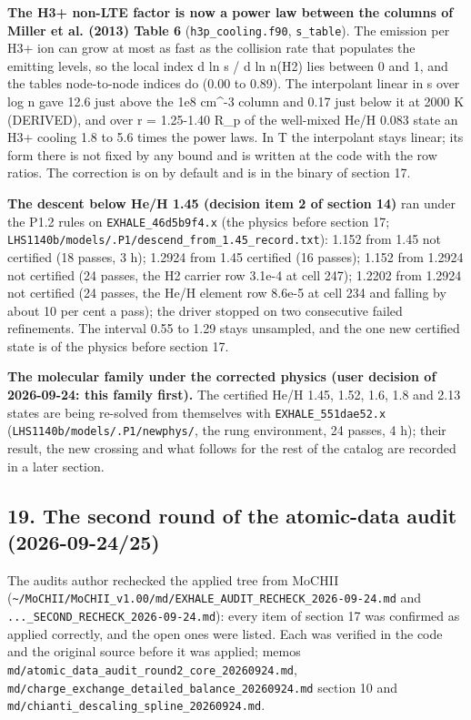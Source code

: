 \documentclass[english,a4paper]{my_memo}
\begin{document}
\textbf{The H3+ non-LTE factor is now a power law between the columns of Miller et
al. (2013) Table 6} (\texttt{h3p\_cooling.f90}, \texttt{s\_table}). The emission per H3+
ion can grow at most as fast as the collision rate that populates the
emitting levels, so the local index d ln s / d ln n(H2) lies between 0 and 1,
and the table\textquotesingle s node-to-node indices do (0.00 to 0.89). The interpolant
linear in s over log n gave 12.6 just above the 1e8 cm\^{}-3 column and 0.17
just below it at 2000 K (DERIVED), and over r = 1.25-1.40 R\_p of the
well-mixed He/H 0.083 state an H3+ cooling 1.8 to 5.6 times the power law\textquotesingle s.
In T the interpolant stays linear; its form there is not fixed by any bound
and is written at the code with the row ratios. The correction is on by
default and is in the binary of section 17.

\textbf{The descent below He/H 1.45 (decision item 2 of section 14)} ran under the
P1.2 rules on \texttt{EXHALE\_46d5b9f4.x} (the physics before section 17;
\texttt{LHS1140b/models/.P1/descend\_from\_1.45\_record.txt}): 1.152 from 1.45 not
certified (18 passes, 3 h); 1.2924 from 1.45 certified (16 passes); 1.152 from
1.2924 not certified (24 passes, the H2 carrier row 3.1e-4 at cell 247);
1.2202 from 1.2924 not certified (24 passes, the He/H element row 8.6e-5 at
cell 234 and falling by about 10 per cent a pass); the driver stopped on two
consecutive failed refinements. The interval 0.55 to 1.29 stays unsampled,
and the one new certified state is of the physics before section 17.

\textbf{The molecular family under the corrected physics (user decision of
2026-09-24: this family first).} The certified He/H 1.45, 1.52, 1.6, 1.8
and 2.13 states are being re-solved from themselves with
\texttt{EXHALE\_551dae52.x} (\texttt{LHS1140b/models/.P1/newphys/}, the rung environment,
24 passes, 4 h); their result, the new crossing and what follows for the
rest of the catalog are recorded in a later section.

\subsection{19. The second round of the atomic-data audit (2026-09-24/25)}\label{19-the-second-round-of-the-atomic-data-audit-2026-09-2425}

The audit\textquotesingle s author rechecked the applied tree from MoCHII
(\texttt{\textasciitilde{}/MoCHII/MoCHII\_v1.00/md/EXHALE\_AUDIT\_RECHECK\_2026-09-24.md} and
\texttt{...\_SECOND\_RECHECK\_2026-09-24.md}): every item of section 17 was confirmed as
applied correctly, and the open ones were listed. Each was verified in the
code and the original source before it was applied; memos
\texttt{md/atomic\_data\_audit\_round2\_core\_20260924.md},
\texttt{md/charge\_exchange\_detailed\_balance\_20260924.md} section 10 and
\texttt{md/chianti\_descaling\_spline\_20260924.md}.
\end{document}
